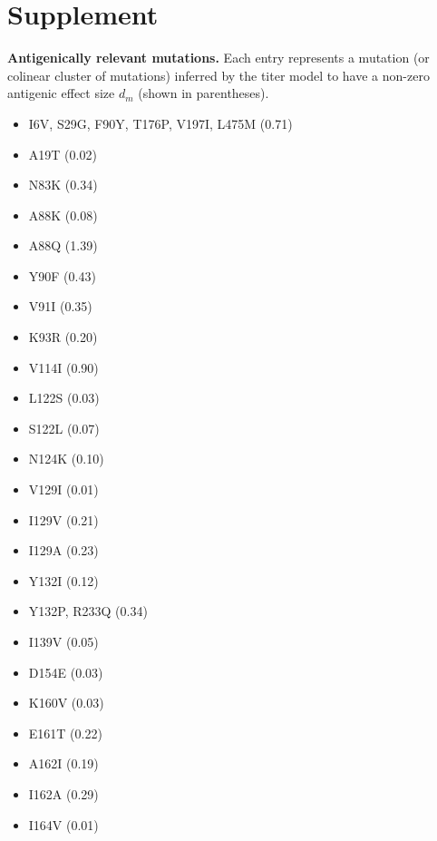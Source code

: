 \documentclass[11pt,oneside,letterpaper]{article}
\begin{document}



\newpage

\section*{Supplement}

\setcounter{figure}{0}
\setcounter{table}{0}
\renewcommand{\thefigure}{S\arabic{figure}}
\renewcommand{\thetable}{S\arabic{table}}

\begin{table}[ht]
  \centering
  \caption{
    \textbf{Antigenically relevant mutations.}
    Each entry represents a mutation (or colinear cluster of mutations) inferred by the titer model to have a non-zero antigenic effect size $d_m$ (shown in parentheses).
  }
  \label{antigenic_mutations}
  \begin{multicols}{3}
    \begin{itemize}
      \raggedright
      \item I6V, S29G, F90Y, T176P, V197I, L475M (0.71)
      \item A19T (0.02)
      \item N83K (0.34)
      \item A88K (0.08)
      \item A88Q (1.39)
      \item Y90F (0.43)
      \item V91I (0.35)
      \item K93R (0.20)
      \item V114I (0.90)
      \item L122S (0.03)
      \item S122L (0.07)
      \item N124K (0.10)
      \item V129I (0.01)
      \item I129V (0.21)
      \item I129A (0.23)
      \item Y132I (0.12)
      \item Y132P, R233Q (0.34)
      \item I139V (0.05)
      \item D154E (0.03)
      \item K160V (0.03)
      \item E161T (0.22)
      \item A162I (0.19)
      \item I162A (0.29)
      \item I164V (0.01)

\end{itemize}
\end{multicols}
\end{table}
\end{document}
